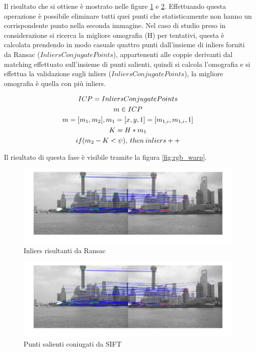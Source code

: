 \documentclass[11pt, oneside]{article}   	%
\begin{document}
\pagebreak
 Il risultato che si ottiene è mostrato nelle figure \ref{fig:corr_reg} e \ref{fig:wrong_reg}.
  Effettuando questa operazione è possibile eliminare tutti quei punti che statisticamente non hanno un corrispondente punto nella seconda immagine. Nel caso di studio preso in considerazione si ricerca la migliore omografia (H) per tentativi, questa è calcolata prendendo in modo casuale quattro punti dall'insieme di inliers forniti da Ransac ($InliersConjugatePoints$), appartenenti alle coppie derivanti dal matching effettuato sull’insieme di punti salienti, quindi si calcola l'omografia e si effettua la validazione sugli inliers ($InliersConjugatePoints$), la migliore omografia è quella con più inliers.
 
\begin{gather}
	ICP = InliersConjugatePoints \notag \\
	m  \in ICP \notag \\
	m = [m_1,m_2] , m_1 = [x,y,1] = [m_{1,i},m_{1,i},1]\notag \\
	K = H * m_1 \notag \\ 
	if  ( m_2 - K < \psi), \: then  \: inliers++  \notag
\end{gather}

Il risultato di questa fase è visibile tramite la figura \ref{fig:rgb_warp}.

	
\begin{figure}[H]
\includegraphics[width=\textwidth]{correct_match_salient_points.jpg}
\caption{Inliers risultanti da Ransac}
\label{fig:corr_reg}
\end{figure}

\begin{figure}[H]
\includegraphics[width=\textwidth]{wrong_match_salient_points.jpg}
\caption{Punti salienti coniugati da SIFT}
\label{fig:wrong_reg}
\end{figure}
\end{document}
